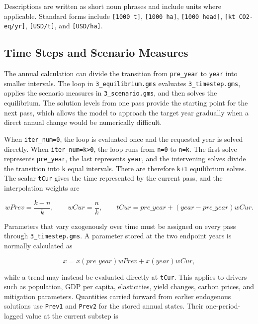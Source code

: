 Descriptions are written as short noun phrases and include units where applicable. Standard forms include \texttt{[1000 t]}, \texttt{[1000 ha]}, \texttt{[1000 head]}, \texttt{[kt CO2-eq/yr]}, \texttt{[USD/t]}, and \texttt{[USD/ha]}.

\subsection{Time Steps and Scenario Measures}

The annual calculation can divide the transition from \texttt{pre\_year} to \texttt{year} into smaller intervals. The loop in \texttt{3\_equilibrium.gms} evaluates \texttt{3\_timestep.gms}, applies the scenario measures in \texttt{3\_scenario.gms}, and then solves the equilibrium. The solution levels from one pass provide the starting point for the next pass, which allows the model to approach the target year gradually when a direct annual change would be numerically difficult.

When \texttt{iter\_num=0}, the loop is evaluated once and the requested year is solved directly. When \texttt{iter\_num=k>0}, the loop runs from \texttt{n=0} to \texttt{n=k}. The first solve represents \texttt{pre\_year}, the last represents \texttt{year}, and the intervening solves divide the transition into \texttt{k} equal intervals. There are therefore \texttt{k+1} equilibrium solves. The scalar \texttt{tCur} gives the time represented by the current pass, and the interpolation weights are

\begin{equation}
  wPrev = \frac{k-n}{k}, \qquad
  wCur = \frac{n}{k}, \qquad
  tCur = pre\_year + (year-pre\_year)wCur.
\end{equation}

Parameters that vary exogenously over time must be assigned on every pass through \texttt{3\_timestep.gms}. A parameter stored at the two endpoint years is normally calculated as

\begin{equation}
  x = x(pre\_year)wPrev + x(year)wCur,
\end{equation}

while a trend may instead be evaluated directly at \texttt{tCur}. This applies to drivers such as population, GDP per capita, elasticities, yield changes, carbon prices, and mitigation parameters. Quantities carried forward from earlier endogenous solutions use \texttt{Prev1} and \texttt{Prev2} for the stored annual states. Their one-period-lagged value at the current substep is

